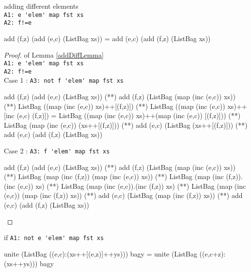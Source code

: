 \begin{lemma}\label{addDiffLemma}adding different elements\\
\verb|A1: e 'elem' map fst xs|\\
\verb|A2: f!=e|
\begin{code}
add (f,z) (add (e,c) (ListBag xs)) = add (e,c) (add (f,z) (ListBag xs))
\end{code}
\end{lemma}
\begin{proof} of Lemma \ref{addDiffLemma}\\
\verb|A1: e 'elem' map fst xs|\\
\verb|A2: f!=e|\\
Case 1 : \verb|A3: not f 'elem' map fst xs|
\begin{code}
add (f,z) (add (e,c) (ListBag xs)) 
             (**) add (f,z) (ListBag (map (inc (e,c)) xs))
             (**) ListBag ((map (inc (e,c)) xs)++[(f,z)])
             (**) ListBag ((map (inc (e,c)) xs)++[inc (e,c) (f,z)])
             = ListBag ((map (inc (e,c)) xs)++(map (inc (e,c)) [(f,z)]))
             (**) ListBag (map (inc (e,c)) (xs++[(f,z)]))
             (**) add (e,c) (ListBag (xs++[(f,z)]))
             (**) add (e,c) (add (f,z) (ListBag xs))
\end{code}
Case 2 : \verb|A3: f 'elem' map fst xs|
\begin{code}
add (f,z) (add (e,c) (ListBag xs)) 
             (**) add (f,z) (ListBag (map (inc (e,c)) xs))
             (**) ListBag (map (inc (f,z)) (map (inc (e,c)) xs))
             (**) ListBag (map (inc (f,z)).(inc (e,c)) xs)
             (*\sEq{\ref{swapIncLemma}}*) ListBag (map (inc (e,c)).(inc (f,z)) xs)
             (**) ListBag (map (inc (e,c)) (map (inc (f,z)) xs))
             (**) add (e,c) (ListBag (map (inc (f,z)) xs))
             (**) add (e,c) (add (f,z) (ListBag xs))
\end{code}
\end{proof}
\begin{lemma}\label{incLemma}if  \verb|A1: not e 'elem' map fst xs|
\begin{code}
unite (ListBag ((e,c):(xs++[(e,z)]++ys))) bagy 
                 = unite (ListBag ((e,c+z):(xs++ys))) bagy
\end{code}
\end{lemma}
